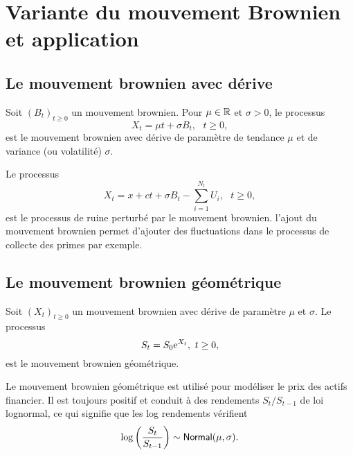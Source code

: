 \section{Variante du mouvement Brownien et application}
\subsection{Le mouvement brownien avec dérive}
\begin{definition}
Soit $(B_t)_{t\geq 0}$ un mouvement brownien. Pour $\mu\in \mathbb{R}$ et $\sigma>0$, le processus 
$$
X_t = \mu t+\sigma B_t,\text{ }t\geq0,
$$
est le mouvement brownien avec dérive de paramètre de tendance $\mu$ et de variance (ou volatilité) $\sigma$.
\end{definition}
\begin{ex}
Le processus 
$$
X_t = x+ct +\sigma B_t-\sum_{i=1}^{N_t}U_i,\text{ }t\geq 0,
$$
est le processus de ruine perturbé par le mouvement brownien. l'ajout du mouvement brownien permet d'ajouter des fluctuations dans le processus de collecte des primes par exemple. 
\end{ex}
\subsection{Le mouvement brownien géométrique}
\begin{definition}
Soit $(X_t)_{t\geq 0}$ un mouvement brownien avec dérive de paramètre $\mu$ et $\sigma$. Le processus 
$$
S_t = S_0\mathrm{e}^{X_t},\text{ }t\geq0,
$$
est le mouvement brownien géométrique.
\end{definition}
Le mouvement brownien géométrique est utilisé pour modéliser le prix des actifs financier. Il est toujours positif et conduit à des rendements $S_t/S_{t-1}$ \iid de loi lognormal, ce qui signifie que les log rendements vérifient 
$$
\log \left(\frac {S_t }{S_{t-1}}\right)\sim\mathsf{Normal}(\mu, \sigma).
$$ 
